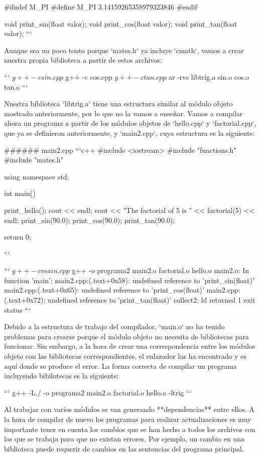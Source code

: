 #ifndef M_PI
#define M_PI 3.14159265358979323846
#endif

void print_sin(float valor);
void print_cos(float valor);
void print_tan(float valor);
```

Aunque sea un poco tonto porque `mates.h` ya incluye `cmath`, vamos a crear nuestra propia biblioteca a partir de estos archivos:

```
$ g++ -c sin.cpp
$ g++ -c cos.cpp
$ g++ -c tan.cpp
$ ar -rvs libtrig.a sin.o cos.o tan.o
```

Nuestra biblioteca `libtrig.a` tiene una estructura similar al módulo objeto mostrado anteriormente, por lo que no la vamos a enseñar. Vamos a compilar ahora un programa a partir de los módulos objetos de `hello.cpp` y `factorial.cpp`, que ya se definieron anteriormente, y `main2.cpp`, cuya estructura es la siguiente:

###### main2.cpp
```c++
#include <iostream>
#include "functions.h"
#include "mates.h"

using namespace std;

int main(){
    print_hello();
    cout << endl;
    cout << "The factorial of 5 is " << factorial(5) << endl;
    print_sin(90.0);
    print_cos(90.0);
    print_tan(90.0);

    return 0;
}
```

```
$ g++ -c main.cpp
$ g++ -o programa2 main2.o factorial.o hello.o
  main2.o: In function 'main':
  main2.cpp:(.text+0x58): undefined reference to 'print_sin(float)'
  main2.cpp:(.text+0x65): undefined reference to 'print_cos(float)'
  main2.cpp:(.text+0x72): undefined reference to 'print_tan(float)'
  collect2: ld returned 1 exit status
```

Debido a la estructura de trabajo del compilador, `main.o` no ha tenido problemas para crearse porque el módulo objeto no necesita de bibliotecas para funcionar. Sin embargo, a la hora de crear una correspondencia entre los módulos objeto con las bibliotecas correspondientes, el enlazador las ha encontrado y es aquí donde se produce el error. La forma correcta de compilar un programa incluyendo bibilotecas es la siguiente:

```
g++ -L./ -o programa2 main2.o factorial.o hello.o -ltrig
```

Al trabajar con varios módulos se van generando **dependencias** entre ellos. A la hora de compilar de nuevo los programas para realizar actualizaciones es muy importante tener en cuenta los cambios que se han hecho a todos los archivos con los que se trabaja para que no existan errores. Por ejemplo, un cambio en una biblioteca puede requerir de cambios en las sentencias del programa principal.

